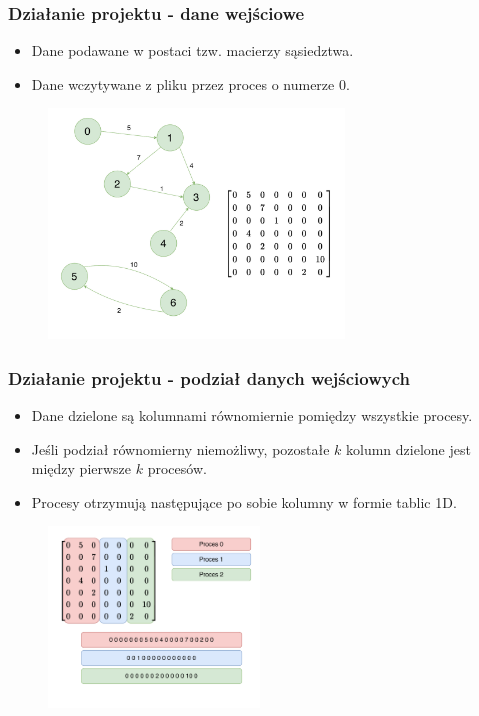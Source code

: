 \documentclass[10pt]{beamer}
\begin{document}
\begin{frame}
\frametitle{Działanie projektu - dane wejściowe}
\begin{itemize}
\item Dane podawane w postaci tzw. macierzy sąsiedztwa.
\item Dane wczytywane z pliku przez proces o numerze 0.
\end{itemize}
\begin{figure}
\centering
\includegraphics[width=0.7\textwidth]{static/Example.pdf}
\end{figure}

\end{frame}

\begin{frame}
\frametitle{Działanie projektu - podział danych wejściowych}
\begin{itemize}
\item Dane dzielone są kolumnami równomiernie pomiędzy wszystkie procesy. 
\item Jeśli podział równomierny niemożliwy, pozostałe $k$ kolumn dzielone jest między pierwsze $k$ procesów.
\item Procesy otrzymują następujące po sobie kolumny w formie tablic 1D.
\end{itemize}
\begin{figure}
\centering
\includegraphics[width=0.5\textwidth]{static/MatrixChunks.pdf}
\end{figure}
\end{frame}
\end{document}

